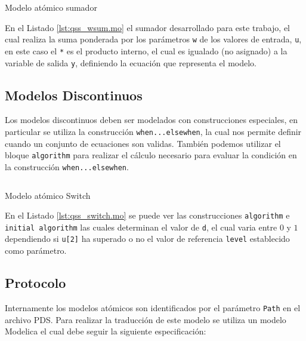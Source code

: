 \begin{listing}[H]
        \inputminted[]{modelica}{../../data/qss/qss_wsum.mo}
        \caption{Modelo atómico sumador}\label{lst:qss_wsum.mo}
\end{listing}
	
	En el Listado \ref{lst:qss_wsum.mo} el sumador desarrollado para este trabajo, el cual realiza la suma ponderada por los parámetros \texttt{w} de los valores de entrada, \texttt{u}, en este caso el \texttt{*} es el producto interno, el cual es igualado (no asignado) a la variable de salida \texttt{y}, definiendo la ecuación que representa el modelo.

\subsection{Modelos Discontinuos}

	Los modelos discontinuos deben ser modelados con construcciones especiales, en particular se utiliza la construcción \texttt{when...elsewhen}, la cual nos
	permite definir cuando un conjunto de ecuaciones son validas. También podemos utilizar el bloque \texttt{algorithm} para realizar el cálculo necesario
	para evaluar la condición en la construcción \texttt{when...elsewhen}.

\begin{listing}[H]
        \inputminted[]{modelica}{../../data/qss/qss_switch.mo}
        \caption{Modelo atómico Switch}\label{lst:qss_switch.mo}
\end{listing}

	En el Listado \ref{lst:qss_switch.mo} se puede ver las construcciones \texttt{algorithm} e \texttt{initial algorithm} las cuales determinan el valor de 
	\texttt{d}, el cual varia entre $0$ y $1$ dependiendo si \texttt{u[2]} ha superado o no el valor de referencia \texttt{level} establecido como parámetro.

\subsection{Protocolo}\label{sec:atom-protocol}

        Internamente los modelos atómicos son identificados por el parámetro \texttt{Path} en el archivo PDS. Para realizar la traducción de este modelo se utiliza 
        un modelo Modelica el cual debe seguir la siguiente especificación:

